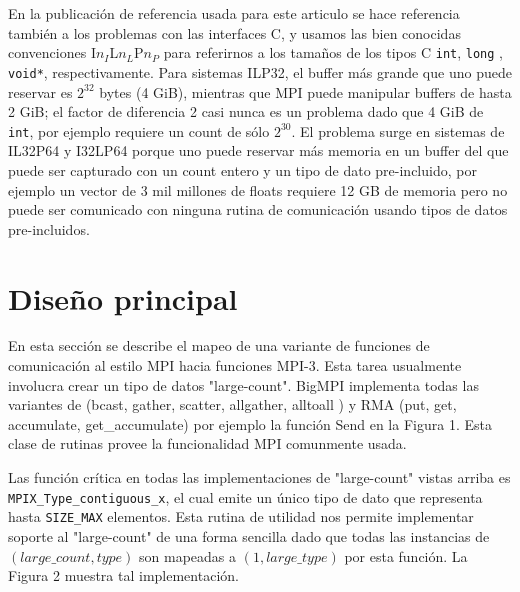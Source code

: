 \documentclass[conference]{IEEEtran}
\begin{document}
En la publicación de referencia usada para este articulo se hace referencia
también a los problemas con las interfaces C, y usamos las bien conocidas convenciones
I$n_{I}$L$n_{L}$P$n_{P}$ para referirnos a los tamaños de los tipos C \texttt{int}, \texttt{long}
, \texttt{void*}, respectivamente. Para sistemas ILP32, el buffer más grande que uno puede
reservar es $2^{32}$ bytes (4 GiB), mientras que MPI puede manipular buffers de hasta 2 GiB;
el factor de diferencia 2 casi nunca es un problema dado que 4 GiB de \texttt{int}, por ejemplo
requiere un count de sólo $2^{30}$. El problema surge en sistemas de IL32P64 y I32LP64 porque
uno puede reservar más memoria en un buffer del que puede ser capturado con un count entero y
un tipo de dato pre-incluido, por ejemplo un vector de 3 mil millones de floats requiere
12 GB de memoria pero no puede ser comunicado con ninguna rutina de comunicación usando
tipos de datos pre-incluidos.

\section{Diseño principal}
En esta sección se describe el mapeo de una variante de funciones de comunicación al
estilo MPI hacia funciones MPI-3. Esta tarea usualmente involucra crear un tipo de datos
"large-count". BigMPI implementa todas las variantes de (bcast, gather, scatter, allgather, alltoall
) y RMA (put, get, accumulate, get\_accumulate) por ejemplo la función Send en la Figura 1.
Esta clase de rutinas provee la funcionalidad MPI comunmente usada.

Las función crítica en todas las implementaciones de "large-count" vistas arriba es
\texttt{MPIX\_Type\_contiguous\_x}, el cual emite un único tipo de dato que representa hasta \texttt{SIZE\_MAX}
elementos. Esta rutina de utilidad nos permite implementar soporte al "large-count" de una
forma sencilla dado que todas las instancias de $(large\_count,type)$ son mapeadas a $(1,large\_type)$
por esta función. La Figura 2 muestra tal implementación.
\end{document}
